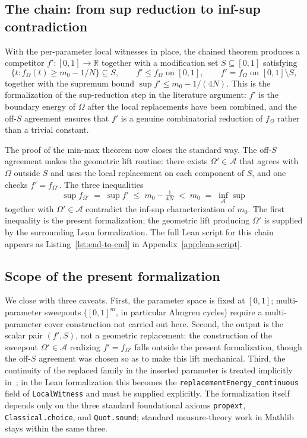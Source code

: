 \subsection{The chain: from sup reduction to inf-sup contradiction}
\label{sec:integration-chain}

With the per-parameter local witnesses in place, the chained
theorem 
produces a competitor $f' : [0,1] \to \mathbb{R}$ together
with a modification set $S \subseteq [0,1]$ satisfying
\[
  \{t : f_\Omega(t) \ge m_0 - 1/N\} \subseteq S, \qquad
  f' \le f_\Omega \text{ on } [0,1], \qquad
  f' = f_\Omega \text{ on } [0,1] \setminus S,
\]
together with the supremum bound
$\sup f' \le m_0 - 1/(4N)$. This is the formalization of the
sup-reduction step in the literature argument: $f'$ is the
boundary energy of $\Omega$ after the local replacements have
been combined, and the off-$S$ agreement ensures that $f'$ is
a genuine combinatorial reduction of $f_\Omega$ rather than a
trivial constant.

The proof of the min-max theorem now closes the standard way.
The off-$S$ agreement makes the geometric lift routine: there
exists $\Omega' \in \mathcal{A}$ that agrees with $\Omega$
outside $S$ and uses the local replacement on each component
of $S$, and one checks $f' = f_{\Omega'}$. The three
inequalities
\[
  \sup f_{\Omega'} \;=\; \sup f' \;\le\; m_0 - \tfrac{1}{4N}
  \;<\; m_0 \;=\; \inf_{\mathcal{A}} \sup
\]
together with $\Omega' \in \mathcal{A}$ contradict the
inf-sup characterization of $m_0$. The first
inequality is the present formalization; the geometric lift
producing $\Omega'$ is supplied by the surrounding Lean
formalization. The full Lean script for this chain appears as
Listing~\ref{lst:end-to-end} in Appendix~\ref{app:lean-script}.


\subsection{Scope of the present formalization}
\label{sec:integration-scope}

We close with three caveats. First, the parameter space is
fixed at $[0,1]$; multi-parameter sweepouts ($[0,1]^m$, in
particular Almgren cycles) require a multi-parameter cover
construction not carried out here. Second, the output is the
scalar pair $(f', S)$, not a geometric replacement: the
construction of the sweepout $\Omega' \in \mathcal{A}$
realizing $f' = f_{\Omega'}$ falls outside the present
formalization, though the off-$S$ agreement was chosen so as
to make this lift mechanical. Third, the continuity of the
replaced family in the inserted parameter is treated
implicitly in~\cite{DLT13}; in the Lean formalization this
becomes the \texttt{replacementEnergy\_continuous} field of
\texttt{LocalWitness} and must be supplied explicitly. The
formalization itself depends only on the three standard
foundational axioms \texttt{propext}, \texttt{Classical.choice},
and \texttt{Quot.sound}; standard measure-theory work in
Mathlib stays within the same three.

